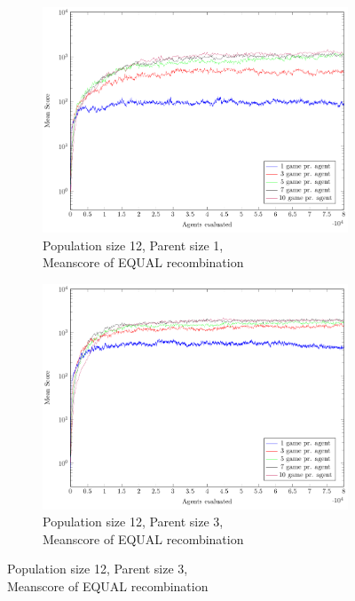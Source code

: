 \begin{figure}
    \centering
    \begin{subfigure}[b]{0.45\textwidth}
    	\centering
        \caption{Population size 12, Parent size 1, \\Meanscore of EQUAL recombination}
        \includegraphics[width=\textwidth]{data/cma_population_offspring/12x_split/equal_l12_o1/mean/PlotFile.pdf}
    \end{subfigure} 
    \begin{subfigure}[b]{0.45\textwidth}
    	\centering
    	\caption{Population size 12, Parent size 3, \\ Meanscore of EQUAL recombination}
        \includegraphics[width=\textwidth]{data/cma_population_offspring/12x_split/equal_l12_o3/mean/PlotFile.pdf}

\end{subfigure}
\end{figure}
